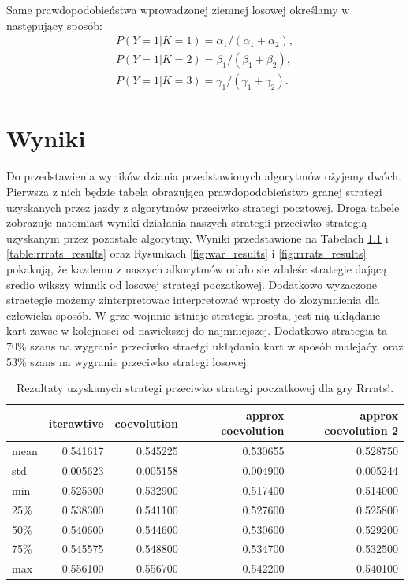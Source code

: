 \documentclass[inzynierska]{pwr_wmat_praca_dyplomowa}
\theoremstyle{plain}
\numberwithin{theorem}{chapter}
\theoremstyle{definition}
\numberwithin{theorem}{chapter}
\begin{document}
		Same prawdopodobieństwa wprowadzonej ziemnej losowej określamy w następujący sposób:  
		\begin{gather*}
			 P(Y = 1|K=1) = \alpha_1/(\alpha_1+\alpha_2),\\
			 P(Y = 1|K=2) = \beta_1/(\beta_1+\beta_2),\\
			 P(Y = 1|K=3) = \gamma_1/(\gamma_1+\gamma_2). 
		\end{gather*}


	
	\chapter{Wyniki}
	Do przedstawienia wyników dziania przedstawionych algorytmów ożyjemy dwóch. Pierwsza z nich będzie tabela obrazująca prawdopodobieństwo granej strategi uzyskanych przez jazdy z algorytmów przeciwko strategi pocztowej. Droga tabele zobrazuje natomiast wyniki działania naszych strategii przeciwko strategią uzyskanym przez pozostałe algorytmy.
	Wyniki przedstawione na Tabelach \ref{table:war_results} i \ref{table:rrrats_results} oraz Rysunkach \ref{fig:war_results} i \ref{fig:rrrats_results} pokakują, że kazdemu z naszych alkorytmów odało sie zdaleśc strategie dającą sredio wikszy winnik od losowej strategi poczatkowej. Dodatkowo wyzaczone straetegie możemy zinterpretowac interpretować wprosty do zlozymnienia dla człowieka sposób.
	W grze wojnnie istnieje strategia prosta, jest nią ukłądanie kart zawse w kolejnosci od nawiekszej do najmniejszej. Dodatkowo strategia ta 70\% szans na wygranie przeciwko straetgi ukłądania kart w sposób malejaćy, oraz 53\% szans na wygranie przeciwko strategi losowej.
	\begin{table}[h]
		\begin{center}
			\begin{tabular}{lrrrr}
				\toprule
				{} &  iterawtive &  coevolution &  approx coevolution &  approx coevolution 2 \\
				\midrule
				mean  &    0.541617 &     0.545225 &             0.530655 &               0.528750 \\
				std   &    0.005623 &     0.005158 &             0.004900 &               0.005244 \\
				min   &    0.525300 &     0.532900 &             0.517400 &               0.514000 \\
				25\%   &    0.538300 &     0.541100 &             0.527600 &               0.525800 \\
				50\%   &    0.540600 &     0.544600 &             0.530600 &               0.529200 \\
				75\%   &    0.545575 &     0.548800 &             0.534700 &               0.532500 \\
				max   &    0.556100 &     0.556700 &             0.542200 &               0.540100 \\
				\bottomrule
			\end{tabular}
			\caption{Rezultaty uzyskanych strategi przeciwko strategi poczatkowej dla gry Rrrats!.}
			\label{table:war_results}
		\end{center}
	\end{table}
\end{document}
